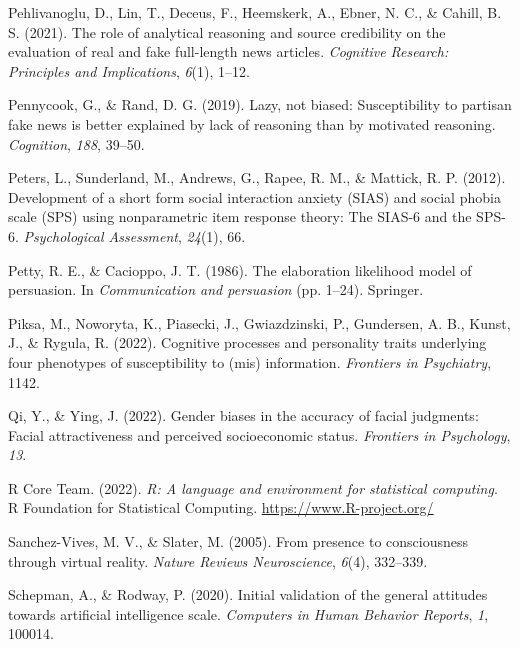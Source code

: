 \documentclass[
  man,floatsintext]{apa6}
\newlength{\cslhangindent}
\newlength{\cslentryspacingunit} %
\newenvironment{CSLReferences}[2] %
 {%
  \setlength{\parindent}{0pt}
  \ifodd #1
  \let\oldpar\par
  \def\par{\hangindent=\cslhangindent\oldpar}
  \fi
  \setlength{\parskip}{#2\cslentryspacingunit}
 }%
 {}
\begin{document}
\begin{CSLReferences}{1}{0}
\leavevmode{}%
Pehlivanoglu, D., Lin, T., Deceus, F., Heemskerk, A., Ebner, N. C., \& Cahill, B. S. (2021). The role of analytical reasoning and source credibility on the evaluation of real and fake full-length news articles. \emph{Cognitive Research: Principles and Implications}, \emph{6}(1), 1--12.

\leavevmode{}%
Pennycook, G., \& Rand, D. G. (2019). Lazy, not biased: Susceptibility to partisan fake news is better explained by lack of reasoning than by motivated reasoning. \emph{Cognition}, \emph{188}, 39--50.

\leavevmode{}%
Peters, L., Sunderland, M., Andrews, G., Rapee, R. M., \& Mattick, R. P. (2012). Development of a short form social interaction anxiety (SIAS) and social phobia scale (SPS) using nonparametric item response theory: The SIAS-6 and the SPS-6. \emph{Psychological Assessment}, \emph{24}(1), 66.

\leavevmode{}%
Petty, R. E., \& Cacioppo, J. T. (1986). The elaboration likelihood model of persuasion. In \emph{Communication and persuasion} (pp. 1--24). Springer.

\leavevmode{}%
Piksa, M., Noworyta, K., Piasecki, J., Gwiazdzinski, P., Gundersen, A. B., Kunst, J., \& Rygula, R. (2022). Cognitive processes and personality traits underlying four phenotypes of susceptibility to (mis) information. \emph{Frontiers in Psychiatry}, 1142.

\leavevmode{}%
Qi, Y., \& Ying, J. (2022). Gender biases in the accuracy of facial judgments: Facial attractiveness and perceived socioeconomic status. \emph{Frontiers in Psychology}, \emph{13}.

\leavevmode{}%
R Core Team. (2022). \emph{R: A language and environment for statistical computing}. R Foundation for Statistical Computing. \url{https://www.R-project.org/}

\leavevmode{}%
Sanchez-Vives, M. V., \& Slater, M. (2005). From presence to consciousness through virtual reality. \emph{Nature Reviews Neuroscience}, \emph{6}(4), 332--339.

\leavevmode{}%
Schepman, A., \& Rodway, P. (2020). Initial validation of the general attitudes towards artificial intelligence scale. \emph{Computers in Human Behavior Reports}, \emph{1}, 100014.


\end{CSLReferences}
\end{document}

